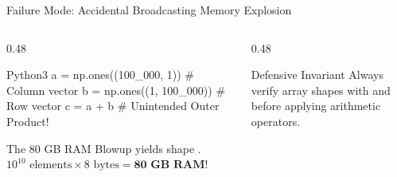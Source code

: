 \begin{frame}[fragile]{Failure Mode: Accidental Broadcasting Memory Explosion}
  \begin{columns}[T,onlytextwidth]
    \begin{column}{0.48\textwidth}
      \begin{HighlightedCodeBlock}{Python}{3}
a = np.ones((100_000, 1)) # Column vector
b = np.ones((1, 100_000)) # Row vector
c = a + b # Unintended Outer Product!
      \end{HighlightedCodeBlock}
      \vspace{0.08cm}
      \begin{WarningBox}{The 80 GB RAM Blowup}
        \scriptsize
         yields shape .
        $10^{10}\text{ elements} \times 8\text{ bytes} = \mathbf{80\text{ GB RAM!}}$
      \end{WarningBox}
    \end{column}
    \begin{column}{0.48\textwidth}
      \vspace{0.10cm}
      \begin{ConceptBox}{Defensive Invariant}
        \scriptsize Always verify array shapes with  and  before applying arithmetic operators.
      \end{ConceptBox}
    \end{column}
  \end{columns}
\end{frame}

